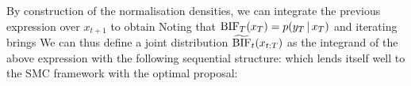 %
By construction of the normalisation densities, we can integrate the previous expression over $x_{t+1}$ to obtain
%
%
Noting that $\text{BIF}_{T}(x_{T})=p(y_{T}\,|\, x_{T})$ and iterating brings
%
%
We can thus define a joint distribution $\widetilde{\text{BIF}}_{t}(x_{t:T})$ as the integrand of the above expression with the following sequential structure:
which lends itself well to the SMC framework with the optimal proposal:
%
%
